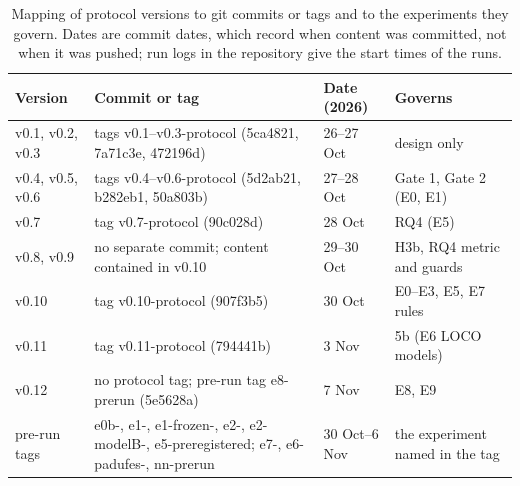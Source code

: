 \documentclass[10pt]{article}
\begin{document}
\begin{table}[!htbp]
\centering
\scriptsize
\caption{Mapping of protocol versions to git commits or tags and to the experiments they govern. Dates are commit dates, which record when content was committed, not when it was pushed; run logs in the repository give the start times of the runs.}
\label{tab:s9map}
\begin{tabular}{@{}p{2.2cm}p{5.6cm}lp{4.2cm}@{}}
\toprule
Version & Commit or tag & Date (2026) & Governs \\
\midrule
v0.1, v0.2, v0.3 & tags v0.1--v0.3-protocol (5ca4821, 7a71c3e, 472196d) & 26--27 Oct & design only \\
v0.4, v0.5, v0.6 & tags v0.4--v0.6-protocol (5d2ab21, b282eb1, 50a803b) & 27--28 Oct & Gate 1, Gate 2 (E0, E1) \\
v0.7 & tag v0.7-protocol (90c028d) & 28 Oct & RQ4 (E5) \\
v0.8, v0.9 & no separate commit; content contained in v0.10 & 29--30 Oct & H3b, RQ4 metric and guards \\
v0.10 & tag v0.10-protocol (907f3b5) & 30 Oct & E0--E3, E5, E7 rules \\
v0.11 & tag v0.11-protocol (794441b) & 3 Nov & 5b (E6 LOCO models) \\
v0.12 & no protocol tag; pre-run tag e8-prerun (5e5628a) & 7 Nov & E8, E9 \\
pre-run tags & e0b-, e1-, e1-frozen-, e2-, e2-modelB-, e5-preregistered; e7-, e6-padufes-, nn-prerun & 30 Oct--6 Nov & the experiment named in the tag \\
\bottomrule
\end{tabular}
\end{table}
\end{document}
